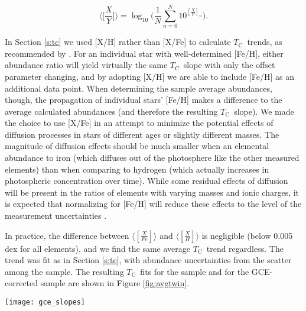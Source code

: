 \documentclass[twocolumn]{aastex62}
\newcommand{\tc}{$T_\mathrm{C}$}
\begin{document}
\begin{equation}
 \Big \langle \Big[ \frac{X}{Y} \Big] \Big \rangle = \log_{10} \Big( \frac{1}{N} \sum_{n=0}^{N} 10^{[\frac{X}{Y}]_n} \Big) .
\end{equation}

In Section \ref{s:tc} we used [X/H] rather than [X/Fe] to calculate \tc\ trends, as recommended by \citet{adibekyan16}. For an individual star with well-determined [Fe/H], either abundance ratio will yield virtually the same \tc\ slope with only the offset parameter changing, and by adopting [X/H] we are able to include [Fe/H] as an additional data point. When determining the sample average abundances, though, the propagation of individual stars' [Fe/H] makes a difference to the average calculated abundances (and therefore the resulting \tc\ slope). We made the choice to use [X/Fe] in an attempt to minimize the potential effects of diffusion processes in stars of different ages or slightly different masses. The magnitude of diffusion effects should be much smaller when  an elemental abundance to iron (which diffuses out of the photosphere like the other measured elements) than when comparing to hydrogen (which actually increases in photospheric concentration over time). While some residual effects of diffusion will be present in the ratios of elements with varying masses and ionic charges, it is expected that normalizing for [Fe/H] will reduce these effects to the level of the measurement uncertainties \citep{dotter17}.

In practice, the difference between $\langle [ \frac{X}{Fe} ] \rangle$ and $\langle [ \frac{X}{H} ] \rangle$ is negligible (below 0.005 dex for all elements), and we find the same average \tc\ trend regardless. The trend was fit as in Section \ref{s:tc}, with abundance uncertainties from the scatter among the sample. The resulting \tc\ fits for the sample and for the GCE-corrected sample are shown in Figure \ref{fig:avgtwin}.

\begin{figure*}
\centering
\texttt{[image: gce\_slopes]}
\caption{}
\label{fig:gce_slopes}
\end{figure*}
\end{document}
